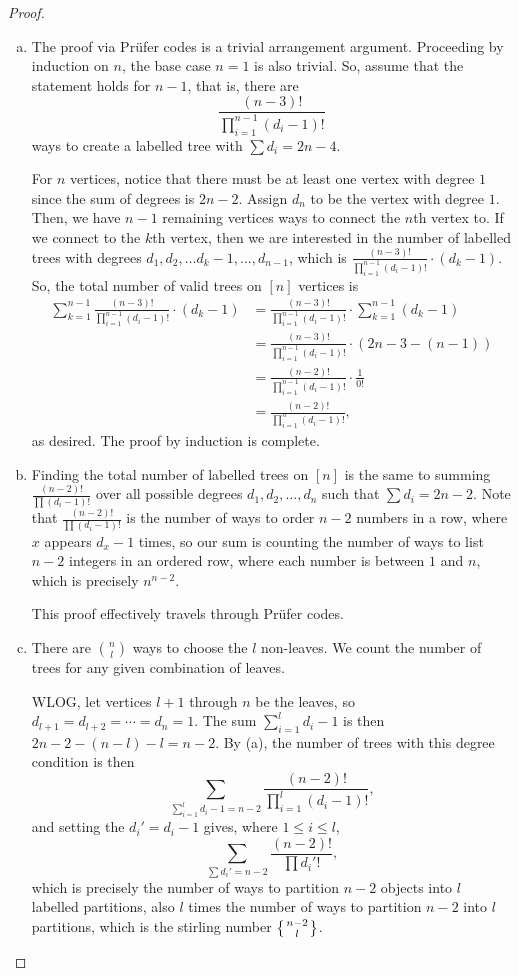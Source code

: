 \documentclass[11pt]{article}
\begin{document}
\begin{proof}
    \begin{enumerate}[(a)]
        \item The proof via Prüfer codes is a trivial arrangement argument. Proceeding by induction on $n$, the base case $n=1$ is also trivial. So, assume that the statement holds for $n-1$, that is, there are \[\frac{(n-3)!}{\prod_{i=1}^{n-1}(d_i-1)!}\] ways to create a labelled tree with $\sum d_i=2n-4$.

        For $n$ vertices, notice that there must be at least one vertex with degree $1$ since the sum of degrees is $2n-2$. Assign $d_n$ to be the vertex with degree $1$. Then, we have $n-1$ remaining vertices ways to connect the $n$th vertex to. If we connect to the $k$th vertex, then we are interested in the number of labelled trees with degrees $d_1,d_2,\dots d_k-1,\dots,d_{n-1}$, which is $\frac{(n-3)!}{\prod_{i=1}^{n-1}(d_i-1)!}\cdot (d_k-1)$. So, the total number of valid trees on $[n]$ vertices is
        \begin{align*}
            \sum_{k=1}^{n-1}\frac{(n-3)!}{\prod_{i=1}^{n-1}(d_i-1)!}\cdot (d_k-1)&=\frac{(n-3)!}{\prod_{i=1}^{n-1}(d_i-1)!}\cdot\sum_{k=1}^{n-1}(d_k-1)\\
            &=\frac{(n-3)!}{\prod_{i=1}^{n-1}(d_i-1)!}\cdot(2n-3-(n-1))\\
            &=\frac{(n-2)!}{\prod_{i=1}^{n-1}(d_i-1)!}\cdot\frac{1}{0!}\\
            &=\frac{(n-2)!}{\prod_{i=1}^n(d_i-1)!},
        \end{align*}
        as desired. The proof by induction is complete.
        \item Finding the total number of labelled trees on $[n]$ is the same to summing $\frac{(n-2)!}{\prod(d_i-1)!}$ over all possible degrees $d_1,d_2,\dots,d_n$ such that $\sum d_i=2n-2$. Note that $\frac{(n-2)!}{\prod(d_i-1)!}$ is the number of ways to order $n-2$ numbers in a row, where $x$ appears $d_x-1$ times, so our sum is counting the number of ways to list $n-2$ integers in an ordered row, where each number is between $1$ and $n$, which is precisely $n^{n-2}$.

        This proof effectively travels through Prüfer codes.
        \item There are $\binom n l$ ways to choose the $l$ non-leaves. We count the number of trees for any given combination of leaves.
        
        
        WLOG, let vertices $l+1$ through $n$ be the leaves, so $d_{l+1}=d_{l+2}=\cdots=d_n=1$. The sum $\sum_{i=1}^l d_i-1$ is then $2n-2-(n-l)-l=n-2$. By (a), the number of trees with this degree condition is then \[\sum_{\sum_{i=1}^l d_i-1=n-2}\frac{(n-2)!}{\prod_{i=1}^l (d_i-1)!},\] and setting the $d_i'=d_i-1$ gives, where $1\leq i\leq l$, \[\sum_{\sum d_i'=n-2}\frac{(n-2)!}{\prod d_i'!},\] which is precisely the number of ways to partition $n-2$ objects into $l$ labelled partitions, also $l\!$ times the number of ways to partition $n-2$ into $l$ partitions, which is the stirling number $\left\{\genfrac{}{}{0pt}{}{n-2}{l}\right\}$.


\end{enumerate}
\end{proof}
\end{document}
